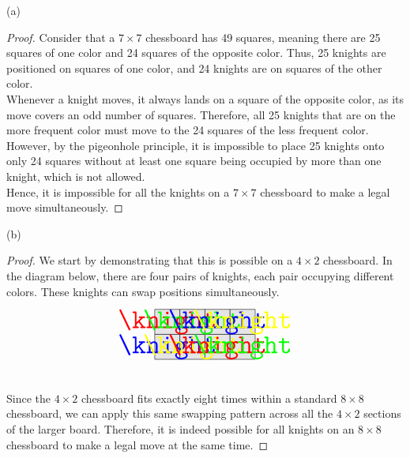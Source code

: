 \documentclass{article}
\begin{document}
(a) 

\begin{proof}
    Consider that a $7 \times 7$ chessboard has 49 squares, meaning there are 25 squares of one color and 24 squares of the opposite color. Thus, 25 knights are positioned on squares of one color, and 24 knights are on squares of the other color. \\
    Whenever a knight moves, it always lands on a square of the opposite color, as its move covers an odd number of squares. Therefore, all 25 knights that are on the more frequent color must move to the 24 squares of the less frequent color. \\
    However, by the pigeonhole principle, it is impossible to place 25 knights onto only 24 squares without at least one square being occupied by more than one knight, which is not allowed. \\
    Hence, it is impossible for all the knights on a $7 \times 7$ chessboard to make a legal move simultaneously.
\end{proof}

\noindent (b)

\begin{proof}
We start by demonstrating that this is possible on a $4 \times 2$ chessboard. In the diagram below, there are four pairs of knights, each pair occupying different colors. These knights can swap positions simultaneously. \\
\[
\begin{tikzpicture}[scale=0.8]

\definecolor{color1}{rgb}{1,0,0}   %
\definecolor{color2}{rgb}{0,1,0}   %
\definecolor{color3}{rgb}{0,0,1}   %
\definecolor{color4}{rgb}{1,1,0}   %

\foreach \x in {0,1,2,3} {
    \foreach \y in {0,1} {
        \fill[gray!20] (\x,\y) rectangle (\x+1,\y+1); 
        \draw (\x,\y) rectangle (\x+1,\y+1);
    }
}

\node at (0.5,1.5) {\textcolor{color1}{\Huge\knight}}; %
\node at (1.5,1.5) {\textcolor{color2}{\Huge\knight}}; %
\node at (2.5,1.5) {\textcolor{color3}{\Huge\knight}}; %
\node at (3.5,1.5) {\textcolor{color4}{\Huge\knight}}; %

\node at (0.5,0.5) {\textcolor{color3}{\Huge\knight}}; %
\node at (1.5,0.5) {\textcolor{color4}{\Huge\knight}}; %
\node at (2.5,0.5) {\textcolor{color1}{\Huge\knight}}; %
\node at (3.5,0.5) {\textcolor{color2}{\Huge\knight}}; %

\end{tikzpicture}
\] \\

\noindent Since the $4 \times 2$ chessboard fits exactly eight times within a standard $8 \times 8$ chessboard, we can apply this same swapping pattern across all the $4 \times 2$ sections of the larger board. Therefore, it is indeed possible for all knights on an $8 \times 8$ chessboard to make a legal move at the same time.

\end{proof}
\end{document}

